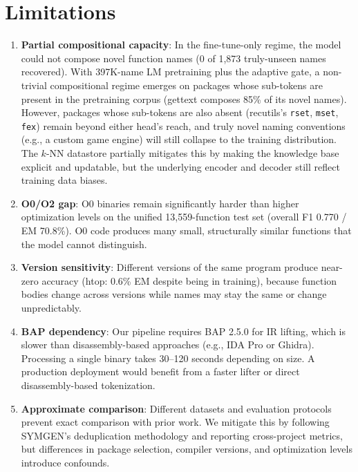 \documentclass[sigconf,nonacm]{acmart}
\begin{document}
\section{Limitations}
\label{sec:limitations}

\begin{enumerate}
    \item \textbf{Partial compositional capacity}: In the fine-tune-only regime, the model could not compose novel function names (0 of 1{,}873 truly-unseen names recovered). With 397K-name LM pretraining plus the adaptive gate, a non-trivial compositional regime emerges on packages whose sub-tokens are present in the pretraining corpus (gettext composes 85\% of its novel names). However, packages whose sub-tokens are also absent (recutils's \texttt{rset}, \texttt{mset}, \texttt{fex}) remain beyond either head's reach, and truly novel naming conventions (e.g., a custom game engine) will still collapse to the training distribution. The $k$-NN datastore partially mitigates this by making the knowledge base explicit and updatable, but the underlying encoder and decoder still reflect training data biases.

    \item \textbf{O0/O2 gap}: O0 binaries remain significantly harder than higher optimization levels on the unified 13,559-function test set (overall F1 0.770 / EM 70.8\%). O0 code produces many small, structurally similar functions that the model cannot distinguish.

    \item \textbf{Version sensitivity}: Different versions of the same program produce near-zero accuracy (htop: 0.6\% EM despite being in training), because function bodies change across versions while names may stay the same or change unpredictably.

    \item \textbf{BAP dependency}: Our pipeline requires BAP 2.5.0 for IR lifting, which is slower than disassembly-based approaches (e.g., IDA Pro or Ghidra). Processing a single binary takes 30--120 seconds depending on size. A production deployment would benefit from a faster lifter or direct disassembly-based tokenization.

    \item \textbf{Approximate comparison}: Different datasets and evaluation protocols prevent exact comparison with prior work. We mitigate this by following SYMGEN's deduplication methodology and reporting cross-project metrics, but differences in package selection, compiler versions, and optimization levels introduce confounds.


\end{enumerate}
\end{document}
